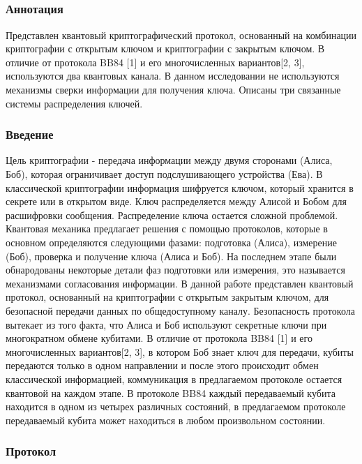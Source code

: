 \subsection{\trnas}


\subsubsection*{Аннотация}
Представлен квантовый криптографический протокол, основанный на комбинации криптографии с открытым ключом и криптографии с закрытым ключом. В отличие от протокола BB84 [1] и его многочисленных вариантов[2, 3], используются два квантовых канала. В данном исследовании не используются механизмы сверки информации для получения ключа. Описаны три связанные системы распределения ключей.

\subsubsection{Введение}
Цель криптографии - передача информации между двумя сторонами (Алиса, Боб), которая ограничивает доступ подслушивающего устройства (Ева). В классической криптографии информация шифруется ключом, который хранится в секрете или в открытом виде. Ключ распределяется между Алисой и Бобом для расшифровки сообщения. Распределение ключа остается сложной проблемой. Квантовая механика предлагает решения с помощью протоколов, которые в основном определяются следующими фазами: подготовка (Алиса), измерение (Боб), проверка и получение ключа (Алиса и Боб).
На последнем этапе были обнародованы некоторые детали фаз подготовки или измерения, это называется механизмами согласования информации.
В данной работе представлен квантовый протокол, основанный на криптографии с открытым закрытым ключом, для безопасной передачи данных по общедоступному каналу. Безопасность протокола вытекает из того факта, что Алиса и Боб используют секретные ключи при многократном обмене кубитами. В отличие от протокола BB84 [1] и его многочисленных вариантов[2, 3], в котором Боб знает ключ для передачи, кубиты передаются только в одном направлении и после этого происходит обмен классической информацией, коммуникация в предлагаемом протоколе остается квантовой на каждом этапе. В протоколе BB84 каждый передаваемый кубита находится в одном из четырех различных состояний, в предлагаемом протоколе передаваемый кубита может находиться в любом произвольном состоянии.

\subsubsection{Протокол}

